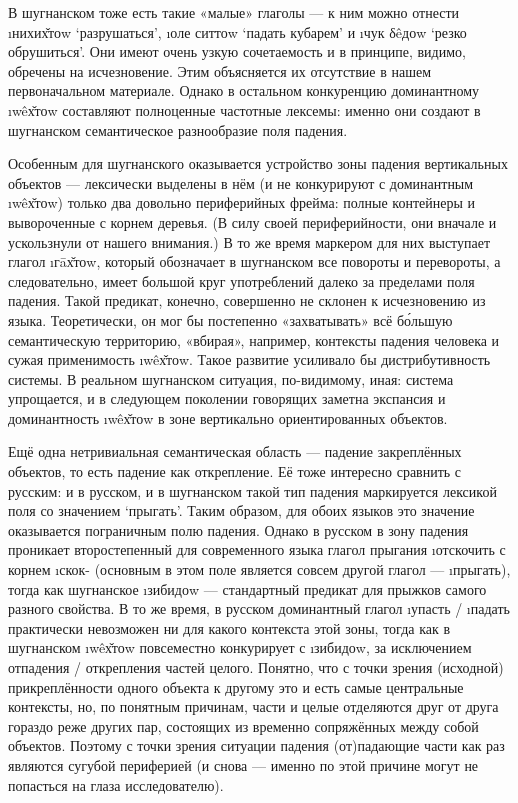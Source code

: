 В шугнанском тоже есть такие «малые» глаголы — к ним можно отнести \i{нихих̌тоw} ‘разрушаться’, \i{оле ситтоw} ‘падать кубарем’ и \i{чук δêдоw} ‘резко обрушиться’. Они имеют очень узкую сочетаемость и в принципе, видимо, обречены на исчезновение. Этим объясняется их отсутствие в нашем первоначальном материале. Однако в остальном конкуренцию доминантному \i{wêх̌тоw} составляют полноценные частотные лексемы: именно они создают в шугнанском семантическое разнообразие поля падения.

Особенным для шугнанского оказывается устройство зоны падения вертикальных объектов — лексически выделены в нём (и не конкурируют с доминантным \i{wêх̌тоw}) только два довольно периферийных фрейма: полные контейнеры и вывороченные с корнем деревья. (В силу своей периферийности, они вначале и ускользнули от нашего внимания.) В то же время маркером для них выступает глагол \i{гāх̌тоw}, который обозначает в шугнанском все повороты и перевороты, а следовательно, имеет большой круг употреблений далеко за пределами поля падения. Такой предикат, конечно, совершенно не склонен к исчезновению из языка. Теоретически, он мог бы постепенно «захватывать» всё бо́льшую семантическую территорию, «вбирая», например, контексты падения человека и сужая применимость \i{wêх̌тоw}. Такое развитие усиливало бы дистрибутивность системы. В реальном шугнанском ситуация, по-видимому, иная: система упрощается, и в следующем поколении говорящих заметна экспансия и доминантность \i{wêх̌тоw} в зоне вертикально ориентированных объектов.

Ещё одна нетривиальная семантическая область — падение закреплённых объектов, то есть падение как открепление. Её тоже интересно сравнить с русским: и в русском, и в шугнанском такой тип падения маркируется лексикой поля со значением ‘прыгать’. Таким образом, для обоих языков это значение оказывается пограничным полю падения. Однако в русском в зону падения проникает второстепенный для современного языка глагол прыгания \i{отскочить} с корнем \i{скок}- (основным в этом поле является совсем другой глагол — \i{прыгать}), тогда как шугнанское \i{зибидоw} — стандартный предикат для прыжков самого разного свойства. В то же время, в русском доминантный глагол \i{упасть} / \i{падать} практически невозможен ни для какого контекста этой зоны, тогда как в шугнанском \i{wêх̌тоw} повсеместно конкурирует с \i{зибидоw}, за исключением отпадения / открепления частей целого. Понятно, что с точки зрения (исходной) прикреплённости одного объекта к другому это и есть самые центральные контексты, но, по понятным причинам, части и целые отделяются друг от друга гораздо реже других пар, состоящих из временно сопряжённых между собой объектов. Поэтому с точки зрения ситуации падения (от)падающие части как раз являются сугубой периферией (и снова — именно по этой причине могут не попасться на глаза исследователю).

